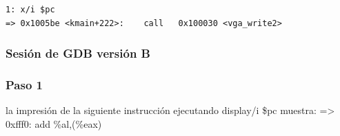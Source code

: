\documentclass[a4paper]{article}
\begin{document}
\begin{lstlisting}
1: x/i $pc
=> 0x1005be <kmain+222>:	call   0x100030 <vga_write2>
\end{lstlisting}

\subsubsection{Sesión de GDB versión B}

\subsubsection*{Paso 1} 
\begin{list}{•}
\item la impresión de la siguiente instrucción ejecutando display/i \$pc muestra: \newline
=> 0xfff0:	add    \%al,(\%eax) \newline \newline 
\end{list}
\end{document}
